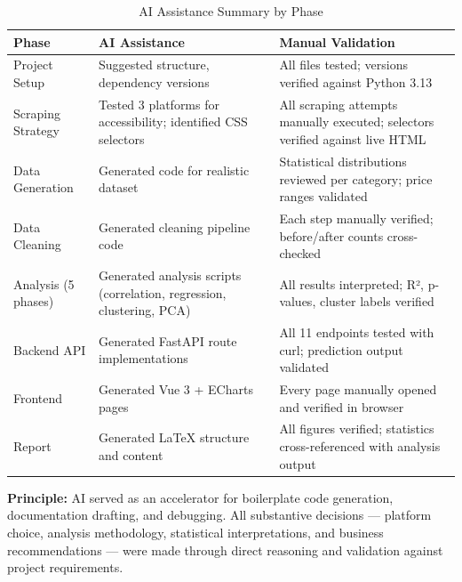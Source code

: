 \documentclass[12pt,a4paper]{report}
\begin{document}
\begin{table}[H]
  \centering
  \caption{AI Assistance Summary by Phase}
  \begin{tabular}{@{}lp{4.5cm}p{5cm}@{}}
    \toprule
    \textbf{Phase} & \textbf{AI Assistance} & \textbf{Manual Validation} \\
    \midrule
    Project Setup       & Suggested structure, dependency versions & All files tested; versions verified against Python 3.13 \\
    Scraping Strategy   & Tested 3 platforms for accessibility; identified CSS selectors & All scraping attempts manually executed; selectors verified against live HTML \\
    Data Generation     & Generated code for realistic dataset & Statistical distributions reviewed per category; price ranges validated \\
    Data Cleaning       & Generated cleaning pipeline code & Each step manually verified; before/after counts cross-checked \\
    Analysis (5 phases) & Generated analysis scripts (correlation, regression, clustering, PCA) & All results interpreted; R², p-values, cluster labels verified \\
    Backend API         & Generated FastAPI route implementations & All 11 endpoints tested with curl; prediction output validated \\
    Frontend            & Generated Vue 3 + ECharts pages & Every page manually opened and verified in browser \\
    Report              & Generated LaTeX structure and content & All figures verified; statistics cross-referenced with analysis output \\
    \bottomrule
  \end{tabular}
\end{table}

\textbf{Principle:} AI served as an accelerator for boilerplate code generation, documentation drafting, and debugging. All substantive decisions --- platform choice, analysis methodology, statistical interpretations, and business recommendations --- were made through direct reasoning and validation against project requirements.
\end{document}
